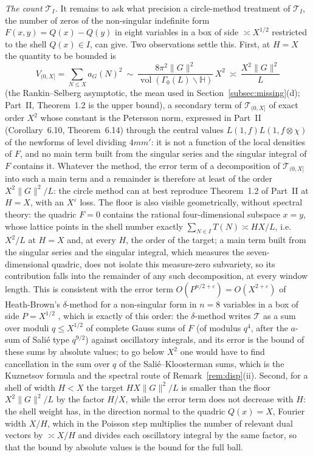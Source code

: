 \documentclass[11pt]{amsart}
\theoremstyle{remark}
\newcommand{\HH}{\mathbb{H}}
\newcommand{\e}{\varepsilon}
\DeclareMathOperator{\vol}{vol}
\begin{document}
\emph{The count $\mathcal T_I$.} It remains to ask what precision a circle-method treatment of $\mathcal T_I$, the number of zeros of the non-singular indefinite form $F(x,y)=Q(x)-Q(y)$ in eight variables in a box of side $\asymp X^{1/2}$ restricted to the shell $Q(x)\in I$, can give. Two observations settle this. First, at $H=X$ the quantity to be bounded is
\[
V_{(0,X]}=\sum_{N\le X}a_G(N)^2\ \sim\ \frac{8\pi^2\|G\|^2}{\vol(\Gamma_0(L)\backslash\HH)}\,X^2\ \asymp\ \frac{X^2\|G\|^2}{L}
\]
(the Rankin--Selberg asymptotic, the mean used in Section~\ref{subsec:missing}(d); Part~II, Theorem~1.2 is the upper bound), a secondary term of $\mathcal T_{(0,X]}$ of exact order $X^2$ whose constant is the Petersson norm, expressed in Part~II (Corollary~6.10, Theorem~6.14) through the central values $L(1,f)L(1,f\otimes\chi)$ of the newforms of level dividing $4mm'$: it is not a function of the local densities of $F$, and no main term built from the singular series and the singular integral of $F$ contains it. Whatever the method, the error term of a decomposition of $\mathcal T_{(0,X]}$ into such a main term and a remainder is therefore at least of the order $X^2\|G\|^2/L$: the circle method can at best reproduce Theorem~1.2 of Part~II at $H=X$, with an $X^\e$ loss. The floor is also visible geometrically, without spectral theory: the quadric $F=0$ contains the rational four-dimensional subspace $x=y$, whose lattice points in the shell number exactly $\sum_{N\in I}T(N)\asymp HX/L$, i.e.\ $X^2/L$ at $H=X$ and, at every $H$, the order of the target; a main term built from the singular series and the singular integral, which measures the seven-dimensional quadric, does not isolate this measure-zero subvariety, so its contribution falls into the remainder of any such decomposition, at every window length. This is consistent with the error term $O(P^{n/2+\e})=O(X^{2+\e})$ of Heath-Brown's $\delta$-method for a non-singular form in $n=8$ variables in a box of side $P=X^{1/2}$ \cite[Theorem~4]{HB}, which is exactly of this order: the $\delta$-method writes $\mathcal T$ as a sum over moduli $q\le X^{1/2}$ of complete Gauss sums of $F$ (of modulus $q^4$, after the $a$-sum of Sali\'e type $q^{9/2}$) against oscillatory integrals, and its error is the bound of these sums by absolute values; to go below $X^2$ one would have to find cancellation in the sum over $q$ of the Sali\'e--Kloosterman sums, which is the Kuznetsov formula and the spectral route of Remark~\ref{rem:disp}(ii). Second, for a shell of width $H<X$ the target $HX\|G\|^2/L$ is smaller than the floor $X^2\|G\|^2/L$ by the factor $H/X$, while the error term does not decrease with $H$: the shell weight has, in the direction normal to the quadric $Q(x)=X$, Fourier width $X/H$, which in the Poisson step multiplies the number of relevant dual vectors by $\asymp X/H$ and divides each oscillatory integral by the same factor, so that the bound by absolute values is the bound for the full ball.
\end{document}
